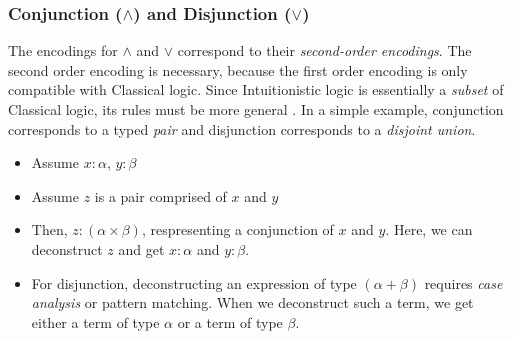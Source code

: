 \documentclass[9pt,preprint,nocopyrightspace,computermodern]{sigplanconf} %
\begin{document}
\subsubsection* {Conjunction (\(\wedge\)) and Disjunction (\(\vee\))}
The encodings for \(\wedge\) and \(\vee\) correspond to their \textit{second-order encodings}.
The second order encoding is necessary, because the first order encoding is only
compatible with Classical logic. Since Intuitionistic logic is essentially a
\textit{subset} of Classical logic, its rules must be more general \cite{lof}.
In a simple example, conjunction corresponds to a typed \textit{pair} and
disjunction corresponds to a \textit{disjoint union}.
\begin{itemize}
\item Assume \(x:\alpha\), \(y:\beta\)
\item Assume \(z\) is a pair comprised of \(x\) and \(y\)
\item Then, \(z:(\alpha\times\beta)\), respresenting a conjunction of \(x\) and \(y\).
  Here, we can deconstruct \(z\) and get \(x:\alpha\) and \(y:\beta\).
\item For disjunction, deconstructing an expression of type \((\alpha + \beta)\)
  requires \textit{case analysis} or pattern matching. When we deconstruct
  such a term, we get either a term of type \(\alpha\) or a term of type \(\beta\).
\end{itemize}

\end{document}
